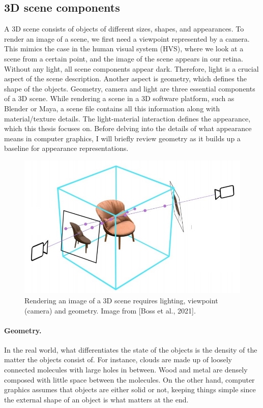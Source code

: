 \subsection{3D scene components}

A 3D scene consists of objects of different sizes, shapes, and appearances. To render an image of a scene, we first need a viewpoint represented by a camera. This mimics the case in the human visual system (\gls{HVS}), where we look at a scene from a certain point, and the image of the scene appears in our retina. Without any light, all scene components appear dark. Therefore, light is a crucial aspect of the scene description. Another aspect is geometry, which defines the shape of the objects. Geometry, camera and light are three essential components of a 3D scene. While rendering a scene in a 3D software platform, such as Blender or Maya, a scene file contains all this information along with material/texture details. The light-material interaction defines the appearance, which this thesis focuses on. Before delving into the details of what appearance means in computer graphics, I will briefly review geometry as it builds up a baseline for appearance representations.

\begin{figure}[ht]
  \centering
   \includegraphics[width=\linewidth]{Images/scene_with_camera.jpg}
   \caption{Rendering an image of a 3D scene requires lighting, viewpoint (camera) and geometry. Image from [Boss et al., 2021].}
   \label{fig:teaser}
\end{figure}


\paragraph{Geometry.} In the real world, what differentiates the state of the objects is the density of the matter the objects consist of. For instance, clouds are made up of loosely connected molecules with large holes in between. Wood and metal are densely composed with little space between the molecules. On the other hand, computer graphics assumes that objects are either solid or not, keeping things simple since the external shape of an object is what matters at the end. 


